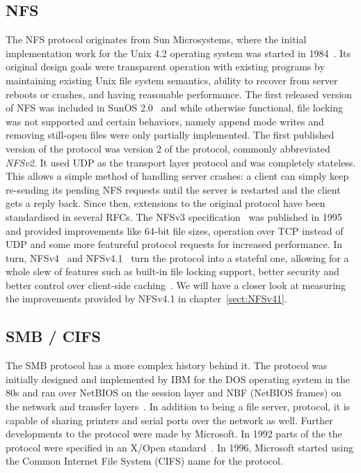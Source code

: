 \subsection{NFS}

The NFS protocol originates from Sun Microsystems, where the initial implementation work for the
Unix 4.2 operating system was started in 1984~\cite{NFS}. Its original design goals were
transparent operation with existing programs by maintaining existing Unix file system
semantics, ability to recover from server reboots or crashes, and having reasonable
performance.
The first released version of NFS was included in SunOS 2.0~\cite{SolarisBook}
and while otherwise functional,
file locking was not supported and certain behaviors,
namely append mode writes and removing still-open files were only partially implemented.
The first published version of the protocol was version 2 of the protocol, commonly abbreviated \emph{NFSv2}.
It used UDP as the transport layer protocol and was completely stateless.
This allows a simple method of handling server crashes: a client can simply keep re-sending
its pending NFS requests until the server is restarted and the client gets a reply back.
Since then, extensions to the original protocol have been standardised
in several RFCs.
The NFSv3 specification~\cite{NFSv3RFC} was published in 1995 and provided improvements
like 64-bit file sizes, operation over TCP instead of UDP and some more featureful protocol
requests for increased performance.
In turn, NFSv4~\cite{NFSv4RFC} and NFSv4.1~\cite{NFSv41RFC} turn the protocol into a stateful one,
allowing for a whole slew of features such as built-in file locking support, better security
and better control over client-side caching~\cite{NFSv4Better}.
We will have a closer look at measuring the improvements provided by NFSv4.1 in chapter~\ref{sect:NFSv41}.

\subsection{SMB / CIFS}

The SMB protocol has a more complex history behind it. The protocol was initially designed
and implemented by IBM for the DOS operating system in the 80s
and ran over NetBIOS on the session layer and NBF (NetBIOS frames) on the network and transfer layers~\cite{CifsBook}.
In addition to being a file server, protocol, it is capable of sharing printers and serial ports over the network as well.
Further developments to the protocol were made by Microsoft.
In 1992 parts of the the protocol were specified in an X/Open standard~\cite{XopenSmbSpec}.
In 1996, Microsoft started using the Common Internet File System (CIFS) name for the protocol.

